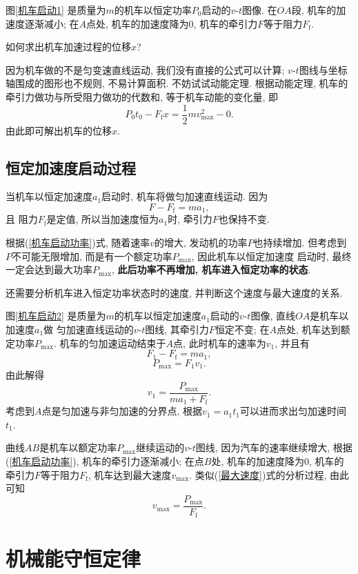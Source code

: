\documentclass[11pt,a4paper]{ctexbook}
\begin{document}
图\ref{机车启动1} 是质量为$m$的机车以恒定功率$P_0$启动的$v$-$t$图像. 在$OA$段, 机车的加速度逐渐减小;
在$A$点处, 机车的加速度降为0, 机车的牵引力$F$等于阻力$F_\mathrm{f}$.

{\kaishu 如何求出机车加速过程的位移$x$? }

因为机车做的不是匀变速直线运动, 我们没有直接的公式可以计算;
$v$-$t$图线与坐标轴围成的图形也不规则, 不易计算面积. 不妨试试动能定理.
根据动能定理, 机车的牵引力做功与所受阻力做功的代数和, 等于机车动能的变化量, 即
$$P_0t_0 - F_\mathrm{f}x = \frac12 m v_\mathrm{max}^2 - 0.$$
由此即可解出机车的位移$x$.

\subsection*{恒定加速度启动过程}

当机车以恒定加速度$a_1$启动时, 机车将做匀加速直线运动. 因为 $$F - F_\mathrm{f} = ma_1, $$ 且
阻力$F_\mathrm{f}$是定值, 所以当加速度恒为$a_1$时, 牵引力$F$也保持不变.

根据(\ref{机车启动功率})式, 随着速率$v$的增大, 发动机的功率$P$也持续增加. 但考虑到
$P$不可能无限增加, 而是有一个额定功率$P_\mathrm{max}$, 因此机车以恒定加速度
启动时, 最终一定会达到最大功率$P_\mathrm{max}$, \textbf{此后功率不再增加, 机车进入恒定功率的状态}.

{\kaishu 还需要分析机车进入恒定功率状态时的速度, 并判断这个速度与最大速度的关系.}

图\ref{机车启动2} 是质量为$m$的机车以恒定加速度$a_1$启动的$v$-$t$图像, 直线$OA$是机车以加速度$a_1$做
匀加速直线运动的$v$-$t$图线, 其牵引力$F$恒定不变; 在$A$点处, 机车达到额定功率$P_\mathrm{max}$.
机车的匀加速运动结束于$A$点, 此时机车的速率为$v_1$, 并且有
$$F_1 - F_\mathrm{f} = ma_1,$$ $$P_\mathrm{max} = F_1v_1.$$
由此解得$$v_1 = \frac{P_\mathrm{max}}{ma_1+F_\mathrm{f}}.$$
考虑到$A$点是匀加速与非匀加速的分界点, 根据$v_1 = a_1t_1$可以进而求出匀加速时间$t_1$.

曲线$AB$是机车以额定功率$P_\mathrm{max}$继续运动的$v$-$t$图线, 因为汽车的速率继续增大, 根据(\ref{机车启动功率}),
机车的牵引力逐渐减小; 在点$B$处, 机车的加速度降为0, 机车的牵引力$F$等于阻力$F_\mathrm{f}$,
机车达到最大速度$v_\mathrm{max}$. 类似(\ref{最大速度})式的分析过程, 由此可知$$v_\mathrm{max} = \frac{P_\mathrm{max}}{F_\mathrm{f}}.$$

\section{机械能守恒定律}
\end{document}
